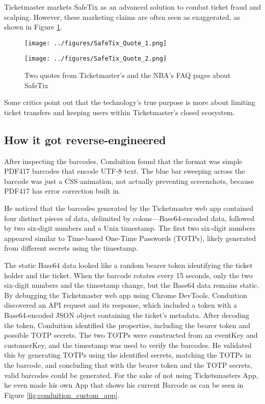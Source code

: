 Ticketmaster markets SafeTix as an advanced solution to combat ticket fraud and scalping.
However, these marketing claims are often seen as exaggerated, as shown in Figure \ref{fig:safetix_quotes}.
\begin{figure}[H]
    \begin{center}
        \texttt{[image: ../figures/SafeTix\_Quote\_1.png]}
    \end{center}
    \begin{center}
        \texttt{[image: ../figures/SafeTix\_Quote\_2.png]}
    \end{center}
    \caption{Two quotes from Ticketmaster's and the NBA's FAQ pages about SafeTix \cite{ticketmaster_safetix_faq} \cite{nba_safetix_faq}}
    \label{fig:safetix_quotes}
\end{figure}
Some critics point out that the technology’s true purpose is more about limiting ticket transfers and keeping users within Ticketmaster's closed ecosystem.

\subsection{How it got reverse-engineered}
After inspecting the barcodes, Conduition found that the format was simple PDF417 barcodes that encode UTF-8 text. 
The blue bar sweeping across the barcode was just a CSS animation, 
not actually preventing screenshots, because PDF417 has error correction built in.

He noticed that the barcodes generated by the Ticketmaster web app contained four distinct pieces of data, 
delimited by colons—Base64-encoded data, followed by two six-digit numbers and a Unix timestamp. 
The first two six-digit numbers appeared similar to Time-based One-Time Passwords (TOTPs), 
likely generated from different secrets using the timestamp.

The static Base64 data looked like a random bearer token identifying the ticket holder and the ticket. 
When the barcode rotates every 15 seconds, only the two six-digit numbers and the timestamp change, but the Base64 data remains static. 
By debugging the Ticketmaster web app using Chrome DevTools, Conduition discovered an API request and its response, 
which included a token with a Base64-encoded JSON object containing the ticket's metadata. 
After decoding the token, Conduition identified the properties, including the bearer token and possible TOTP secrets.
The two TOTPs were constructed from an eventKey and customerKey, and the timestamp was used to verify the barcodes. 
He validated this by generating TOTPs using the identified secrets, matching the TOTPs in the barcode, 
and concluding that with the bearer token and the TOTP secrets, valid barcodes could be generated.
For the sake of not using Ticketsmasters App, he even made his own App that shows his current Barcode as can be seen in Figure \ref{fig:conduition_custom_app}.

